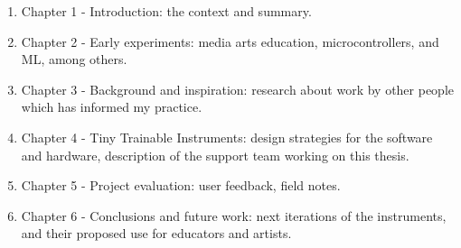 \begin{enumerate}
  \item Chapter 1 - Introduction: the context and summary.
  \item Chapter 2 - Early experiments: media arts education, microcontrollers, and \acrshort{ML}, among others.
  \item Chapter 3 - Background and inspiration: research about work by other people which has informed my practice.
  \item Chapter 4 - Tiny Trainable Instruments: design strategies for the software and hardware, description of the support team working on this thesis.
  \item Chapter 5 - Project evaluation: user feedback, field notes.
  \item Chapter 6 - Conclusions and future work: next iterations of the instruments, and their proposed use for educators and artists.
  \end{enumerate}

